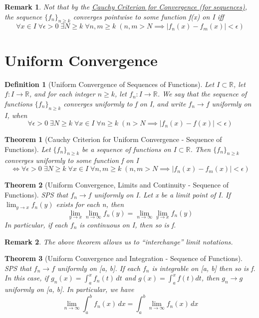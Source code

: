 \documentclass[11pt, oneside]{book}
\theoremstyle{break}
\newtheorem{thm}{Theorem}[section]
\newtheorem*{remark}{Remark}
\newtheorem{defn}{Definition}[section]
\newcommand{\bb}[1]{\mathbb{#1}}		%
\begin{document}
\begin{remark}
	Not that by the \hyperref[CauchyCriterion_Seq]{Cauchy Criterion for Convergence (for sequences)}, the sequence $\{f_n\}_{n \geq k}$ converges pointwise to some function f(x) on I iff
	\[
		\forall x \in I \; \forall \epsilon > 0 \; \exists N \geq k \; \forall n, m \geq k \; (n, m > N \implies |f_n(x) - f_m(x)| < \epsilon)
	\]
\end{remark}


\section{Uniform Convergence}

\begin{defn}[Uniform Convergence of Sequences of Functions]
	Let $I \subset \bb{R}$, let $f: I \to \bb{R}$, and for each integer $n \geq k$, let $f_n: I \to \bb{R}$. We say that the sequence of functions $\{f_n\}_{n \geq k}$ converges uniformly to f on I, and write $f_n \to f$ uniformly on I, when
	\[
		\forall \epsilon > 0 \; \exists N \geq k \; \forall x \in I \; \forall n \geq k \; (n > N \implies |f_n(x) - f(x)| < \epsilon)
	\]
\end{defn}

\begin{thm}[Cauchy Criterion for Uniform Convergence - Sequence of Functions]
	Let $\{f_n\}_{n \geq k}$ be a sequence of functions on $I \subset \bb{R}$. Then $\{f_n\}_{n \geq k}$ converges uniformly to some function f on I
	\[
		\iff \forall \epsilon > 0 \; \exists N \geq k \; \forall x \in I \; \forall n, m \geq k \; (n , m > N \implies |f_n(x) - f_m(x)| < \epsilon)
	\]
\end{thm}

\begin{thm}[Uniform Convergence, Limits and Continuity - Sequence of Functions]
	SPS that $f_n \to f$ uniformly on I. Let x be a limit point of I. If $\lim_{y \to x} f_n(y)$ exists for each n, then
	\[
		\lim_{y \to x} \lim_{n \to \infty} f_n(y) = \lim_{n \to \infty} \lim_{y \to x} f_n(y)
	\]
	In particular, if each $f_n$ is continuous on I, then so is f.
\end{thm}

\begin{remark}
	The above theorem allows us to ``interchange'' limit notations.
\end{remark}

\begin{thm}[Uniform Convergence and Integration - Sequence of Functions]
	SPS that $f_n \to f$ uniformly on [a, b]. If each $f_n$ is integrable on [a, b] then so is f. In this case, if $g_n(x) = \int_{a}^{x} f_n(t) \,dt$ and $g(x) = \int_{a}^{x} f(t) dt$, then $g_n \to g$ uniformly on [a, b]. In particular, we have
	\[
		\lim_{n \to \infty} \int_{a}^{b} f_n(x) \, dx = \int_{a}^{b} \lim_{n \to \infty} f_n(x) \, dx
	\]
\end{thm}
\end{document}
